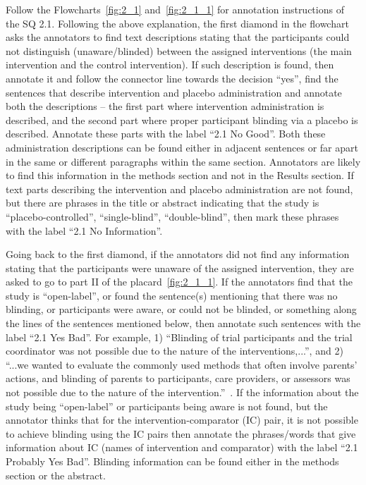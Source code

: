 \documentclass[sn-mathphys,Numbered]{sn-jnl}%
\begin{document}
Follow the Flowcharts~\ref{fig:2_1} and~\ref{fig:2_1_1} for annotation instructions of the SQ 2.1. %
Following the above explanation, the first diamond in the flowchart asks the annotators to find text descriptions stating that the participants could not distinguish (unaware/blinded) between the assigned interventions (the main intervention and the control intervention).
If such description is found, then annotate it and follow the connector line towards the decision ``yes'', find the sentences that describe intervention and placebo administration and annotate both the descriptions – the first part where intervention administration is described, and the second part where proper participant blinding via a placebo is described.
Annotate these parts with the label ``2.1 No Good''.
Both these administration descriptions can be found either in adjacent sentences or far apart in the same or different paragraphs within the same section.
Annotators are likely to find this information in the methods section and not in the Results section. 
If text parts describing the intervention and placebo administration are not found, but there are phrases in the title or abstract indicating that the study is ``placebo-controlled'', ``single-blind'', ``double-blind'', then mark these phrases with the label ``2.1 No Information''.


Going back to the first diamond, if the annotators did not find any information stating that the participants were unaware of the assigned intervention, they are asked to go to part II of the placard~\ref{fig:2_1_1}.
If the annotators find that the study is ``open-label'', or found the sentence(s) mentioning that there was no blinding, or participants were aware, or could not be blinded, or something along the lines of the sentences mentioned below, then annotate such sentences with the label ``2.1 Yes Bad''.
For example, 1) ``Blinding of trial participants and the trial coordinator was not possible due to the nature of the interventions,...'', and 2) ``...we wanted to evaluate the commonly used methods that often involve parents’ actions, and blinding of parents to participants, care providers, or assessors was not possible due to the nature of the intervention.''~\cite{buttery2023lung,andersson2020effect}.
If the information about the study being ``open-label'' or participants being aware is not found, but the annotator thinks that for the intervention-comparator (IC) pair, it is not possible to achieve blinding using the IC pairs then annotate the phrases/words that give information about IC (names of intervention and comparator) with the label ``2.1 Probably Yes Bad''.
Blinding information can be found either in the methods section or the abstract.
%
%
%
\end{document}
